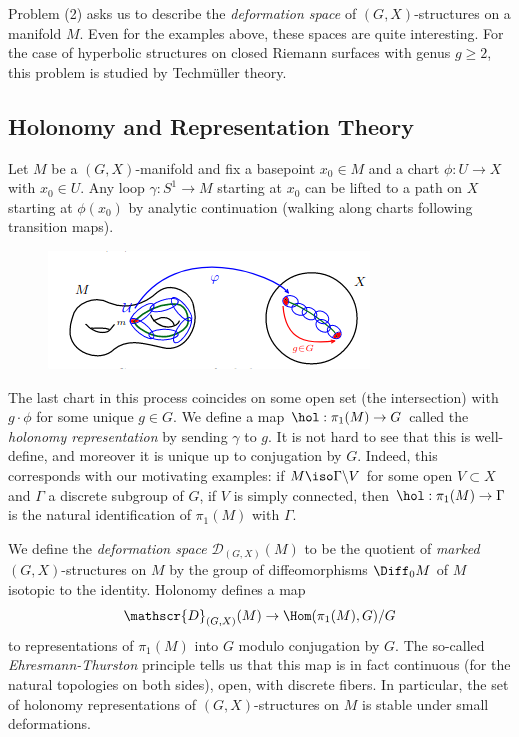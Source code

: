 \documentclass{article}
\begin{document}
Problem (2) asks us to describe the \textit{deformation space} of $(G,X)$-structures on a manifold $M$. Even for the examples above, these spaces are quite interesting. For the case of hyperbolic structures on closed Riemann surfaces with genus $g \geq 2$, this problem is studied by Techm\"uller theory.

\subsection{Holonomy and Representation Theory}
Let $M$ be a $(G,X)$-manifold and fix a basepoint $x_0 \in M$ and a chart $\phi: U \to X$ with $x_0 \in U$. Any loop $\gamma: S^1 \to M$ starting at $x_0$ can be lifted to a path on $X$ starting at $\phi(x_0)$ by analytic continuation (walking along charts following transition maps).
\begin{figure}[H]
	\centering
	\includegraphics[scale=0.5]{holonomy_rep.png}
\end{figure}
The last chart in this process coincides on some open set (the intersection) with $g \cdot \phi$ for some unique $g \in G$. We define a map $\hol: \pi_1(M) \to G$ called the \textit{holonomy representation} by sending $\gamma$ to $g$. It is not hard to see that this is well-define, and moreover it is unique up to conjugation by $G$. Indeed, this corresponds with our motivating examples: if $M \iso \Gamma \backslash V$ for some open $V \subset X$ and $\Gamma$ a discrete subgroup of $G$, if $V$ is simply connected, then $\hol: \pi_1(M) \to \Gamma$ is the natural identification of $\pi_1(M)$ with $\Gamma$.

We define the \textit{deformation space} $\mathscr{D}_{(G,X)}(M)$ to be the quotient of \textit{marked} $(G,X)$-structures on $M$ by the group of diffeomorphisms $\Diff_0M$ of $M$ isotopic to the identity. Holonomy defines a map \[\mathscr{D}_{(G,X)}(M) \to \Hom(\pi_1(M),G)/G\] to representations of $\pi_1(M)$ into $G$ modulo conjugation by $G$. The so-called \textit{Ehresmann-Thurston} principle tells us that this map is in fact continuous (for the natural topologies on both sides), open, with discrete fibers. In particular, the set of holonomy representations of $(G,X)$-structures on $M$ is stable under small deformations.
\end{document}
